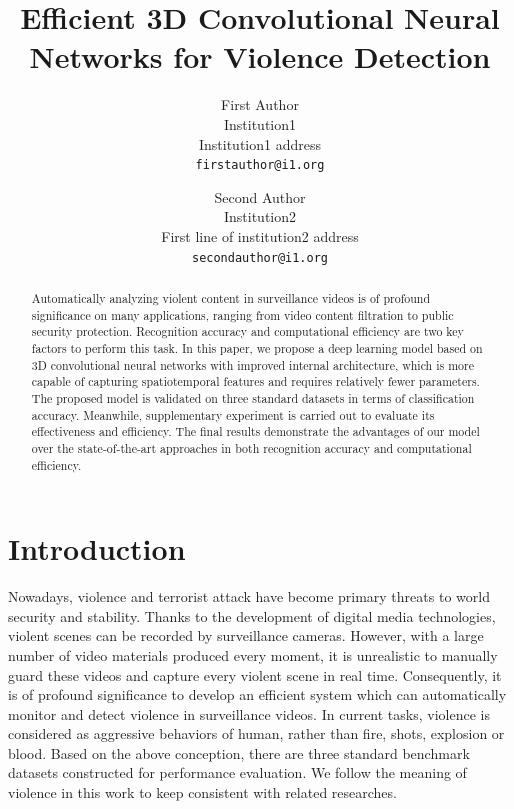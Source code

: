 \documentclass[10pt,twocolumn,letterpaper]{article}
\begin{document}
\title{Efficient 3D Convolutional Neural Networks for Violence Detection}

\author{First Author\\
Institution1\\
Institution1 address\\
{\tt\small firstauthor@i1.org}
\and
Second Author\\
Institution2\\
First line of institution2 address\\
{\tt\small secondauthor@i1.org}
}

\maketitle

\begin{abstract}
Automatically analyzing violent content in surveillance videos is of profound significance on many applications, ranging from video content filtration to public security protection. Recognition accuracy and computational efficiency are two key factors to perform this task. In this paper, we propose a deep learning model based on 3D convolutional neural networks with improved internal architecture, which is more capable of capturing spatiotemporal features and requires relatively fewer parameters. The proposed model is validated on three standard datasets in terms of classification accuracy. Meanwhile, supplementary experiment is carried out to evaluate its effectiveness and efficiency. The final results demonstrate the advantages of our model over the state-of-the-art approaches in both recognition accuracy and computational efficiency.
\end{abstract}

\section{Introduction} \label{sec:1}

Nowadays, violence and terrorist attack have become primary threats to world security and stability.
Thanks to the development of digital media technologies, violent scenes can be recorded by surveillance cameras.
However, with a large number of video materials produced every moment, it is unrealistic to manually guard these videos and capture every violent scene in real time.
Consequently, it is of profound significance to develop an efficient system which can automatically monitor and detect violence in surveillance videos.
In current tasks, violence is considered as aggressive behaviors of human, rather than fire, shots, explosion or blood.
Based on the above conception, there are three standard benchmark datasets constructed for performance evaluation.
We follow the meaning of violence in this work to keep consistent with related researches.
\end{document}
